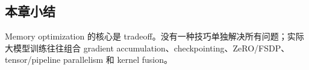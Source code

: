 \subsection{本章小结}

Memory optimization 的核心是 tradeoff。没有一种技巧单独解决所有问题；实际大模型训练往往组合 gradient accumulation、checkpointing、ZeRO/FSDP、tensor/pipeline parallelism 和 kernel fusion。



